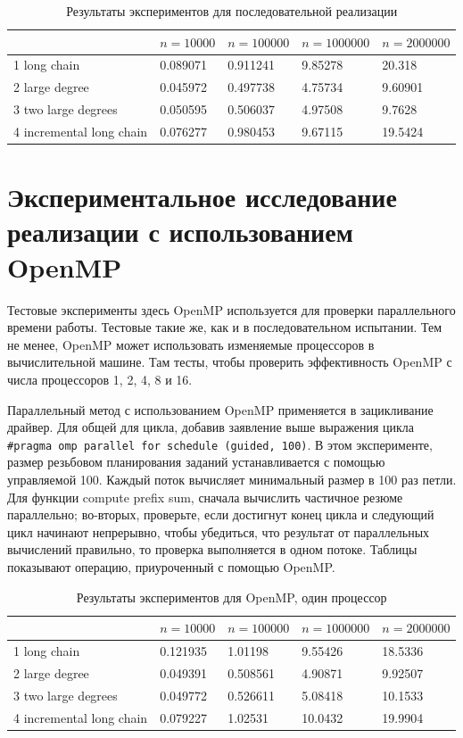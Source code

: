 \documentclass[specification,annotation,times]{itmo-student-thesis}
\newcommand{\revise}[1]{{\color{red!70!black} #1 }}
\begin{document}
\begin{table}[!ht]
\centering
\begin{tabular}{|l|l|l|l|l|}\hline
 & $n=10000$ & $n=100000$ & $n=1000000$ & $n=2000000$ \\\hline
1 long chain & 0.089071 & 0.911241 & 9.85278 & 20.318 \\\hline
2 large degree & 0.045972 & 0.497738 & 4.75734 & 9.60901 \\\hline
3 two large degrees & 0.050595 & 0.506037 & 4.97508 & 9.7628 \\\hline
4 incremental long chain & 0.076277 & 0.980453 & 9.67115 & 19.5424 \\\hline
\end{tabular}
\caption{Результаты экспериментов для последовательной реализации}\label{tbl:results-seq}
\end{table}

\section{Экспериментальное исследование реализации с использованием OpenMP}

\revise{
Тестовые эксперименты здесь OpenMP используется для проверки параллельного времени работы. Тестовые такие же, как и в последовательном испытании. Тем не менее, OpenMP может использовать изменяемые 
процессоров в вычислительной машине. Там тесты, чтобы проверить эффективность OpenMP с числа процессоров 1, 2, 4, 8 и 16.
}

\revise{
Параллельный метод с использованием OpenMP применяется в зацикливание драйвер. Для общей для цикла, добавив заявление выше выражения цикла 
\texttt{\#pragma omp parallel for schedule (guided, 100)}. В этом 
эксперименте, размер резьбовом планирования заданий устанавливается с помощью управляемой 100. Каждый поток вычисляет минимальный размер в 100 раз петли. Для функции compute prefix sum, сначала вычислить 
частичное резюме параллельно; во-вторых, проверьте, если достигнут конец цикла и следующий цикл начинают непрерывно, чтобы убедиться, что результат от параллельных вычислений правильно, то проверка 
выполняется в одном потоке. Таблицы показывают операцию, приуроченный с помощью OpenMP.
}

\begin{table}[!ht]
\centering
\begin{tabular}{|l|l|l|l|l|}\hline
 & $n=10000$ & $n=100000$ & $n=1000000$ & $n=2000000$ \\\hline
1 long chain & 0.121935 & 1.01198 & 9.55426 & 18.5336 \\\hline
2 large degree & 0.049391 & 0.508561 & 4.90871 & 9.92507 \\\hline
3 two large degrees & 0.049772 & 0.526611 & 5.08418 & 10.1533 \\\hline
4 incremental long chain & 0.079227 & 1.02531 & 10.0432 & 19.9904 \\\hline
\end{tabular}
\caption{Результаты экспериментов для OpenMP, один процессор}\label{tbl:results-openmp-1}
\end{table}
\end{document}
